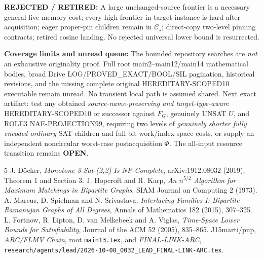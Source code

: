 \documentclass[11pt]{article}
\newcommand{\CS}{\mathcal C_\star}
\begin{document}
\noindent\textbf{REJECTED / RETIRED:} A large unchanged-source frontier is a necessary general live-memory cost; every high-frontier in-target instance is hard after acquisition; eager proper-pin children remain in $\CS$; direct-copy two-level pinning contracts; retired cosine landing. No rejected universal lower bound is resurrected.

\noindent\textbf{Coverage limits and unread queue:} The bounded repository searches are \emph{not} an exhaustive originality proof. Full root main2--main12/main14 mathematical bodies, broad Drive LOG/PROVED\_EXACT/BOOL/SIL pagination, historical revisions, and the missing complete original HEREDITARY-SCOPED10 executable remain unread. No transient local path is assumed shared. Next exact artifact: test any obtained \emph{source-name-preserving and target-type-aware} HEREDITARY-SCOPED10 or successor against $F_G$, genuinely UNSAT $U$, and ROLE3 NAE-PROJECTION99, requiring two levels of \emph{genuinely shorter fully encoded ordinary} SAT children and full bit work/index-space costs, or supply an independent noncircular worst-case postacquisition $\Phi$. The all-input resource transition remains \textbf{OPEN}.

\begin{thebibliography}{5}
 J. D\"ocker, \emph{Monotone 3-Sat-(2,2) Is NP-Complete}, arXiv:1912.08032 (2019), Theorem 1 and Section 3.
 J. Hopcroft and R. Karp, \emph{An $n^{5/2}$ Algorithm for Maximum Matchings in Bipartite Graphs}, SIAM Journal on Computing 2 (1973).
 A. Marcus, D. Spielman and N. Srivastava, \emph{Interlacing Families I: Bipartite Ramanujan Graphs of All Degrees}, Annals of Mathematics 182 (2015), 307--325.
 L. Fortnow, R. Lipton, D. van Melkebeek and A. Viglas, \emph{Time-Space Lower Bounds for Satisfiability}, Journal of the ACM 52 (2005), 835--865.
 J15marti/pnp, \emph{ARC/FLMV Chain}, root \texttt{main13.tex}, and \emph{FINAL-LINK-ARC}, \texttt{research/agents/lead/2026-10-08\_0032\_LEAD\_FINAL-LINK-ARC.tex}.
\end{thebibliography}
\end{document}
